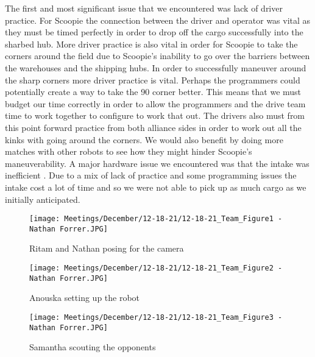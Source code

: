 The first and most significant issue that we encountered was lack of driver practice. For Scoopie the connection between the driver and operator was vital as they must be timed perfectly in order to drop off the cargo successfully into the sharbed hub. More driver practice is also vital in order for Scoopie to take the corners around the field due to Scoopie’s inability to go over the barriers between the warehouses and the shipping hubs. In order to successfully maneuver around the sharp corners more driver practice is vital. Perhaps the programmers could potentially create a way to take the 90 corner better. This means that we must budget our time correctly in order to allow the programmers and the drive team time to work together to configure to work that out. The drivers also must from this point forward practice from both alliance sides in order to work out all the kinks with going around the corners.  We would also benefit by doing more matches with other robots to see how they might hinder Scoopie’s maneuverability. 
A  major hardware issue we encountered was that the intake was inefficient . Due to a mix of lack of practice and some programming issues the intake cost a lot of time and so we were not able to pick up as much cargo as we initially anticipated.




\begin{figure}[ht]
\centering
\begin{minipage}[b]{.48\textwidth}
  \centering
  \texttt{[image: Meetings/December/12-18-21/12-18-21\_Team\_Figure1 - Nathan Forrer.JPG]}
  \caption{Ritam and Nathan posing for the camera}
  \label{fig:121821_1}
\end{minipage}%
\hfill%
\begin{minipage}[b]{.48\textwidth}
  \centering
  \texttt{[image: Meetings/December/12-18-21/12-18-21\_Team\_Figure2 - Nathan Forrer.JPG]}
  \caption{Anouska setting up the robot}
  \label{fig:121821_2}
\end{minipage}
\end{figure}

\begin{figure}[htp]
\centering
\texttt{[image: Meetings/December/12-18-21/12-18-21\_Team\_Figure3 - Nathan Forrer.JPG]}
\caption{Samantha scouting the opponents}
\label{fig:121821_3}
\end{figure}









